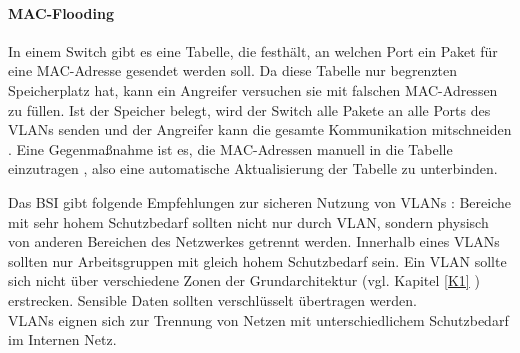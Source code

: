  
 \paragraph{MAC-Flooding}
 \begin{addmargin}[1cm]{1cm}
 In einem Switch gibt es eine Tabelle, die festhält, an welchen Port ein Paket für eine MAC-Adresse gesendet werden soll. Da diese Tabelle nur begrenzten Speicherplatz hat, kann ein Angreifer versuchen sie mit falschen MAC-Adressen zu füllen. Ist der Speicher belegt, wird der Switch alle Pakete an alle Ports des VLANs senden und der Angreifer kann die gesamte Kommunikation mitschneiden \cite{mehdizadeha2017virtual}.
Eine Gegenmaßnahme ist es, die MAC-Adressen manuell in die Tabelle einzutragen \cite{akram2017future}, also eine automatische Aktualisierung der Tabelle zu unterbinden. \\
 
 	
 \end{addmargin}


Das BSI gibt folgende Empfehlungen zur sicheren Nutzung von VLANs \cite{bsiLogSeg}: 
Bereiche mit sehr hohem Schutzbedarf sollten nicht nur durch VLAN, sondern physisch von anderen Bereichen des Netzwerkes getrennt werden. Innerhalb eines VLANs sollten nur Arbeitsgruppen mit gleich hohem Schutzbedarf sein. Ein VLAN sollte sich nicht über verschiedene Zonen der Grundarchitektur (vgl. Kapitel \ref{K1} ) erstrecken. Sensible Daten sollten verschlüsselt übertragen werden.\\
VLANs eignen sich zur Trennung von Netzen mit unterschiedlichem Schutzbedarf im Internen Netz.










